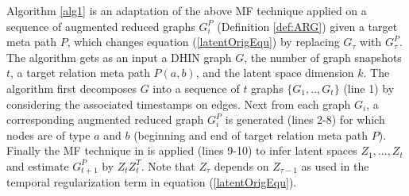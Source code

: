 Algorithm \ref{alg1} is an adaptation of the above MF technique applied on a sequence of augmented reduced graphs $G^P_i$ (Definition \ref{def:ARG}) given a target meta path $P$, which changes equation (\ref{latentOrigEqu}) by replacing $G_\tau$ with $G^{P}_\tau$.
The algorithm gets as an input a DHIN graph $G$, the number of graph snapshots $t$, a target relation meta path $P(a,b)$, and the latent space dimension $k$. The algorithm first decomposes $G$ into a sequence of $t$ graphs $\{G_1, .., G_t\}$ (line 1) by considering the associated timestamps on edges. Next from each graph $G_i$, a corresponding augmented reduced graph $G^P_i$ is generated (lines 2-8) for which nodes are of type $a$ and $b$ (beginning and end of target relation meta path $P$). Finally the MF technique in \cite{Zhu2016} is applied (lines 9-10) to infer latent spaces $Z_1, ...,Z_t$ and estimate $G^P_{t+1}$ by $Z_tZ_t^T$.
Note that $Z_\tau$ depends on $Z_{\tau-1}$ as used in the temporal regularization term in equation (\ref{latentOrigEqu}).


